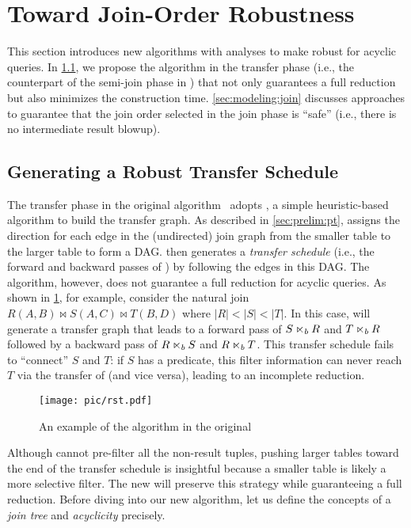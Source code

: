 \section{Toward Join-Order Robustness}
\label{sec:modeling}

This section introduces new algorithms with analyses to make \PT robust for acyclic queries. In \cref{sec:modeling:transfer}, we propose the \TreeStruct algorithm in the transfer phase (i.e., the counterpart of the semi-join phase in \Yann) that not only guarantees a full reduction but also minimizes the \BF construction time. \cref{sec:modeling:join} discusses approaches to guarantee that the join order selected in the join phase is ``safe'' (i.e., there is no intermediate result blowup).

\subsection{Generating a Robust Transfer Schedule}
\label{sec:modeling:transfer}

The transfer phase in the original \PT algorithm~\cite{yang2023PT} adopts \StoL, a simple heuristic-based algorithm to build the transfer graph. As described in \cref{sec:prelim:pt}, \StoL assigns the direction for each edge in the (undirected) join graph from the smaller table to the larger table to form a DAG. \PT then generates a \emph{transfer schedule} (i.e., the forward and backward passes of \BFs) by following the edges in this DAG. The \StoL algorithm, however, does not guarantee a full reduction for acyclic queries. As shown in \cref{fig:small2large-example}, for example, consider the natural join $R(A,B) \Join S(A,C) \Join T(B, D)$ where $|R| < |S| < |T|$. In this case, \StoL will generate a transfer graph that leads to a forward pass of $S \ltimes_b R$ and $T \ltimes_b R$ followed by a backward pass of $R \ltimes_b S$ and $R \ltimes_b T$. This transfer schedule fails to ``connect'' $S$ and $T$: if $S$ has a predicate, this filter information can never reach $T$ via the transfer of \BFs (and vice versa), leading to an incomplete reduction.

\begin{figure}[t!]
    \center
    \texttt{[image: pic/rst.pdf]}
    \caption{An example of the \StoL algorithm in the original \PT}
    \label{fig:small2large-example}
\end{figure}

Although \StoL cannot pre-filter all the non-result tuples, pushing larger tables toward the end of the transfer schedule is insightful because a smaller table is likely a more selective filter. The new \TreeStruct will preserve this strategy while guaranteeing a full reduction. Before diving into our new algorithm, let us define the concepts of a \emph{join tree} and \emph{acyclicity} precisely.

